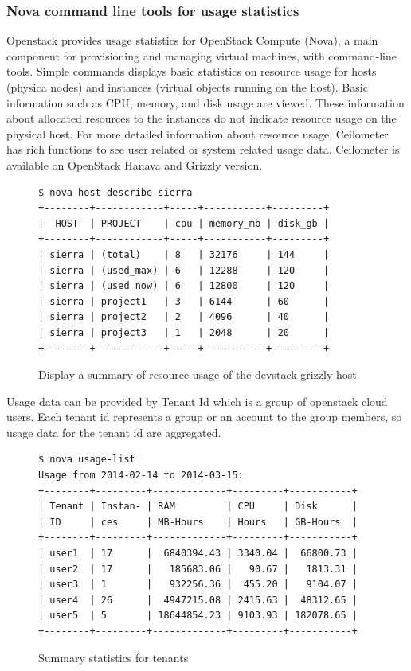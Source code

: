 \documentclass{sig-alternate}
\begin{document}
\subsubsection{Nova command line tools for usage statistics}

Openstack provides usage statistics for OpenStack Compute (Nova), a main component for provisioning and managing virtual machines, with command-line tools. Simple commands displays basic statistics on resource usage for hosts (physica nodes) and instances (virtual objects running on the host). Basic information such as CPU, memory, and disk usage are viewed. These information about allocated resources to the instances do not indicate resource usage on the physical host. For more detailed information about resource usage, Ceilometer has rich functions to see user related or system related usage data. Ceilometer is available on OpenStack Hanava and Grizzly version. 

\begin{figure}[h!]
\begin{small}
\begin{verbatim}
$ nova host-describe sierra
+--------+------------+-----+-----------+---------+
|  HOST  | PROJECT    | cpu | memory_mb | disk_gb |
+--------+------------+-----+-----------+---------+
| sierra | (total)    | 8   | 32176     | 144     |
| sierra | (used_max) | 6   | 12288     | 120     |
| sierra | (used_now) | 6   | 12800     | 120     |
| sierra | project1   | 3   | 6144      | 60      |
| sierra | project2   | 2   | 4096      | 40      |
| sierra | project3   | 1   | 2048      | 20      |
+--------+------------+-----+-----------+---------+
\end{verbatim}
\end{small}
\caption{Display a summary of resource usage of the devstack-grizzly host}
\label{F:host-describe}
\end{figure}

Usage data can be provided by Tenant Id which is a group of openstack cloud users. Each tenant id represents a group or an account to the group members, so usage data for the tenant id are aggregated. 

\begin{figure}[h!]
\begin{small}
\begin{verbatim}
$ nova usage-list
Usage from 2014-02-14 to 2014-03-15:
+--------+---------+-------------+---------+-----------+
| Tenant | Instan- | RAM         | CPU     | Disk      |
| ID     | ces     | MB-Hours    | Hours   | GB-Hours  |
+--------+---------+-------------+---------+-----------+
| user1  | 17      |  6840394.43 | 3340.04 |  66800.73 |
| user2  | 17      |   185683.06 |   90.67 |   1813.31 |
| user3  | 1       |   932256.36 |  455.20 |   9104.07 |
| user4  | 26      |  4947215.08 | 2415.63 |  48312.65 |
| user5  | 5       | 18644854.23 | 9103.93 | 182078.65 |
+--------+---------+-------------+---------+-----------+
\end{verbatim}
\end{small}

\caption{Summary statistics for tenants}
\label{F:host-describe}

\end{figure}
\end{document}
